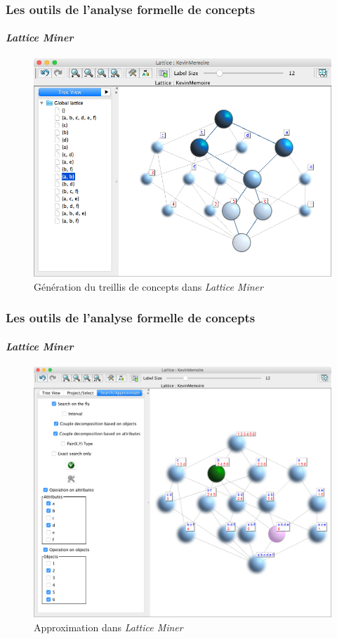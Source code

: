 \documentclass[french]{beamer}
\newcommand{\lm}{\emph{Lattice Miner}\xspace}
\begin{document}
\begin{frame}
\frametitle{Les outils de l'analyse formelle de concepts}
\framesubtitle{\lm}
\begin{figure}[H]
\caption{Génération du treillis de concepts dans \lm}
\label{cap:fig:lm-treillis}
\begin{center}\includegraphics[scale=0.32]{figures/lm-treillis.jpg}\end{center}
\end{figure}
\end{frame}
\begin{frame}
\frametitle{Les outils de l'analyse formelle de concepts}
\framesubtitle{\lm}
\begin{figure}[H]
\caption{Approximation dans \lm}
\label{cap:fig:lm-approxime}
\begin{center}\includegraphics[scale=0.22]{figures/Approxime.PNG}\end{center}
\end{figure}
\end{frame}
\end{document}
